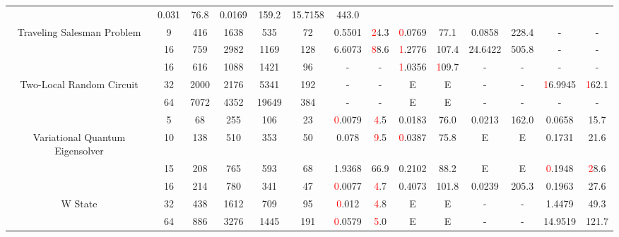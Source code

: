 \begin{table}[htb]
{\begin{tabular}{|c|c|c|c|c|c|c|c|c|c|c|c|c|c|}
 & 0.031 & 76.8
 & 0.0169 & 159.2
 & 15.7158 & 443.0
 \\
Traveling Salesman Problem & 
9 & 416 & 1638 & 535 & 72
 & 0.5501 & \textcolor{red}24.3
 & \textcolor{red}0.0769 & 77.1
 & 0.0858 & 228.4
 & - & -
 \\
 & 
16 & 759 & 2982 & 1169 & 128
 & 6.6073 & \textcolor{red}88.6
 & \textcolor{red}1.2776 & 107.4
 & 24.6422 & 505.8
 & - & -
 \\
\hline
 & 
16 & 616 & 1088 & 1421 & 96
 & - & -
 & \textcolor{red}1.0356 & \textcolor{red}109.7
 & - & -
 & - & -
 \\
Two-Local Random Circuit & 
32 & 2000 & 2176 & 5341 & 192
 & - & -
 & E & E
 & - & -
 & \textcolor{red}16.9945 & \textcolor{red}162.1
 \\
 & 
64 & 7072 & 4352 & 19649 & 384
 & - & -
 & E & E
 & - & -
 & - & -
 \\
\hline
 & 
5 & 68 & 255 & 106 & 23
 & \textcolor{red}0.0079 & \textcolor{red}4.5
 & 0.0183 & 76.0
 & 0.0213 & 162.0
 & 0.0658 & 15.7
 \\
Variational Quantum Eigensolver & 
10 & 138 & 510 & 353 & 50
 & 0.078 & \textcolor{red}9.5
 & \textcolor{red}0.0387 & 75.8
 & E & E
 & 0.1731 & 21.6
 \\
 & 
15 & 208 & 765 & 593 & 68
 & 1.9368 & 66.9
 & 0.2102 & 88.2
 & E & E
 & \textcolor{red}0.1948 & \textcolor{red}28.6
 \\
\hline
 & 
16 & 214 & 780 & 341 & 47
 & \textcolor{red}0.0077 & \textcolor{red}4.7
 & 0.4073 & 101.8
 & 0.0239 & 205.3
 & 0.1963 & 27.6
 \\
W State & 
32 & 438 & 1612 & 709 & 95
 & \textcolor{red}0.012 & \textcolor{red}4.8
 & E & E
 & - & -
 & 1.4479 & 49.3
 \\
 & 
64 & 886 & 3276 & 1445 & 191
 & \textcolor{red}0.0579 & \textcolor{red}5.0
 & E & E
 & - & -
 & 14.9519 & 121.7
 \\
\hline
\end{tabular}}
\end{table}